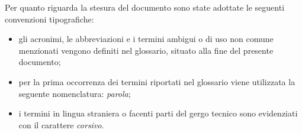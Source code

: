 Per quanto riguarda la stesura del documento sono state adottate le seguenti convenzioni tipografiche:
\begin{itemize}
	\item gli acronimi, le abbreviazioni e i termini ambigui o di uso non comune menzionati vengono definiti nel glossario, situato alla fine del presente documento;
	\item per la prima occorrenza dei termini riportati nel glossario viene utilizzata la seguente nomenclatura: \emph{parola}\glsfirstoccur;
	\item i termini in lingua straniera o facenti parti del gergo tecnico sono evidenziati con il carattere \emph{corsivo}.
\end{itemize}
